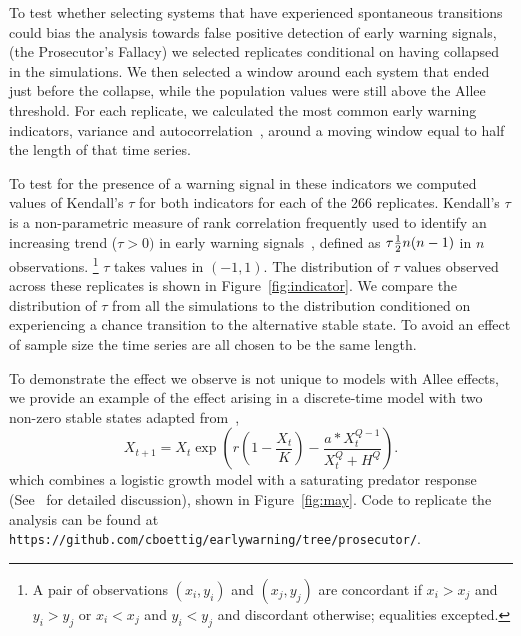 \documentclass[authoryear,review,12pt]{elsarticle}
\begin{document}
To test whether selecting systems that have experienced
spontaneous transitions could bias the analysis towards false
positive detection of early warning signals, (the Prosecutor's
Fallacy) we selected replicates conditional on having collapsed
in the simulations.  We then selected a window around each system
that ended just before the collapse, while the population values
were still above the Allee threshold.  For each replicate, we
calculated the most common early warning indicators, variance and
autocorrelation~\citep[\emph{e.g.}][]{Carpenter2006,Dakos2008,Scheffer2009},
around a moving window equal to half the length of that time series.


To test for the presence of a warning signal in these indicators we
computed values of Kendall's $\tau$ for both indicators for each of
the 266 replicates.  Kendall's $\tau$ is a non-parametric measure
of rank correlation frequently used to identify an increasing trend
($\tau > 0 )$ in early warning signals~\citep{Dakos2008, Dakos2011},
defined as $\tau \def \tfrac{(\text{number of concordant pairs}) -
(\text{number of discordant pairs})}{\frac{1}{2} n (n-1) }$ in $n$
observations.  \footnote{A pair of observations $(x_i,y_i)$ and $(x_j,
y_j)$ are concordant if $x_i > x_j$ and $y_i > y_j$ or $x_i < x_j$ and
$y_i < y_j$ and discordant otherwise; equalities excepted.}  $\tau$ takes
values in $(-1, 1)$.  The distribution of $\tau$ values observed across
these replicates is shown in Figure~\ref{fig:indicator}.  We compare
the distribution of $\tau$ from all the simulations to the distribution
conditioned on experiencing a chance transition to the alternative
stable state.  To avoid an effect of sample size the time series are
all chosen to be the same length.


To demonstrate the effect we observe is not unique to models with Allee
effects, we provide an example of the effect arising in a discrete-time
model with two non-zero stable states adapted from~\citep{May1977},
\begin{equation}
X_{t+1} = X_t \exp\left( r \left(1 - \frac{ X_t }{ K } \right) - \frac{ a * X_t ^ {Q - 1} }{X_t ^ Q + H ^ Q} \right). \label{May1977}
\end{equation}
which combines a logistic growth model with a saturating predator response (See~\citet{May1977} for detailed discussion), shown in Figure~\ref{fig:may}.  Code to replicate the analysis can be found at \\ 
\verb|https://github.com/cboettig/earlywarning/tree/prosecutor/|.
\end{document}
